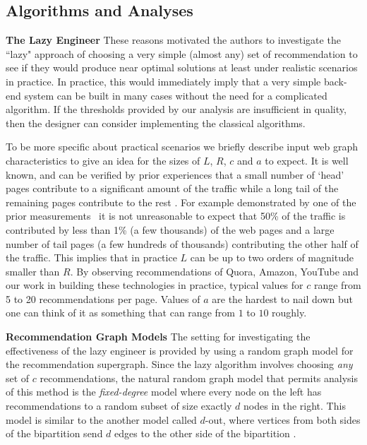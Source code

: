 
\subsection{Algorithms and Analyses}

{\bf The Lazy Engineer} These reasons motivated the authors to
investigate the ``lazy" approach of choosing a very simple (almost
any) set of recommendation to see if they would produce near optimal
solutions at least under realistic scenarios in practice.  In
practice, this would immediately imply that a very simple back-end
system can be built in many cases without the need for a complicated
algorithm. If the thresholds provided by our analysis are insufficient
in quality, then the designer can consider implementing the classical
algorithms. \vs

To be more specific about practical scenarios we briefly describe
input web graph characteristics to give an idea for the sizes of $L$,
$R$, $c$ and $a$ to expect. It is well known, and can be verified by
prior experiences that a small number of `head' pages contribute to a
significant amount of the traffic while a long tail of the remaining
pages contribute to the rest \cite{HubermanAdamic1999, DuDemmerBrewer2006}. For example
demonstrated by one of the prior measurements~\cite{KumarNorrisSun2009}
it is not unreasonable to expect that 50\% of the traffic is
contributed by less than 1\% (a few thousands) of the web pages and a
large number of tail pages (a few hundreds of thousands) contributing
the other half of the traffic. This implies that in practice $L$ can
be up to two orders of magnitude smaller than $R$.  By observing
recommendations of Quora, Amazon, YouTube and our work in building
these technologies in practice, typical values for $c$ range from 5 to
20 recommendations per page. Values of $a$ are the hardest to nail
down but one can think of it as something that can range from $1$ to
$10$ roughly.

{\bf Recommendation Graph Models} The setting for investigating the
effectiveness of the lazy engineer is provided by using a random graph
model for the recommendation supergraph. Since the lazy algorithm
involves choosing {\em any} set of $c$ recommendations, the natural
random graph model that permits analysis of this method is the {\em
  fixed-degree} model where every node on the left has recommendations
to a random subset of size exactly $d$ nodes in the right. This model is
similar to the another model called $d$-out, where vertices from both
sides of the bipartition send $d$ edges to the other side of the bipartition
\cite{FriezePittel2004}.

